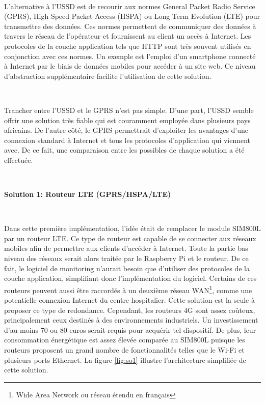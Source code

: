 ~

\noindent
L'alternative à l'USSD est de recourir aux normes General Packet Radio Service (GPRS), High Speed Packet Access (HSPA) ou Long Term Evolution (LTE) pour transmettre des données. Ces normes permettent de communiquer des données à travers le réseau de l'opérateur et fournissent au client un accès à Internet. Les protocoles de la couche application tels que HTTP sont très souvent utilisés en conjonction avec ces normes. Un exemple est l'emploi d'un smartphone connecté à Internet par le biais de données mobiles pour accéder à un site web. Ce niveau d'abstraction supplémentaire facilite l'utilisation de cette solution.

~

\noindent
Trancher entre l'USSD et le GPRS n'est pas simple. D'une part, l'USSD semble offrir une solution très fiable qui est couramment employée dans plusieurs pays africains. De l'autre côté, le GPRS permettrait d'exploiter les avantages d'une connexion standard à Internet et tous les protocoles d'application qui viennent avec. De ce fait, une comparaison entre les possibles de chaque solution a été effectuée.

\newpage


~

\vspace{-0.5cm}
\textbf{Solution 1: Routeur LTE (GPRS/HSPA/LTE)}

\vspace{-0.2cm}
~

\noindent
Dans cette première implémentation, l'idée était de remplacer le module SIM800L par un routeur LTE. Ce type de routeur est capable de se connecter aux réseaux mobiles afin de permettre aux clients d'accéder à Internet. Toute la partie bas niveau des réseaux serait alors traitée par le Raspberry Pi et le routeur. De ce fait, le logiciel de monitoring n'aurait besoin que d'utiliser des protocoles de la couche application, simplifiant donc l'implémentation du logiciel. Certains de ces routeurs peuvent aussi être raccordés à un deuxième réseau WAN\footnote{Wide Area Network ou réseau étendu en français}, comme une potentielle connexion Internet du centre hospitalier. Cette solution est la seule à proposer ce type de redondance. Cependant, les routeurs 4G sont assez coûteux, principalement ceux destinés à des environnements industriels. Un investissement d'au moins 70 ou 80 euros serait requis pour acquérir tel dispositif. De plus, leur consommation énergétique est assez élevée comparée au SIM800L puisque les routeurs proposent un grand nombre de fonctionnalités telles que le Wi-Fi et plusieurs ports Ethernet. La figure \ref{fig:so1} illustre l'architecture simplifiée de cette solution.

